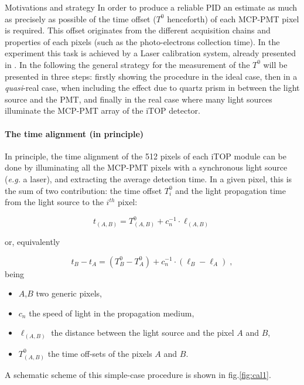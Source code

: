\documentclass[a4paper,11pt]{article}
\newcommand{\eg}{{\itshape e.g. }}
\begin{document}
\begin{subsection}{Motivations and strategy}
In order to produce a reliable PID an estimate as much as precisely as possible of the time offset ($T^0$ henceforth) of each MCP-PMT pixel is required. This offset originates from the different acquisition chains and properties of each pixels (such as the photo-electrons collection time). In the experiment this task is achieved by a Laser calibration system, already presented in \cite{Lasr_calib_syst_PD}. In the following the general strategy for the measurement of the $T^0$ will be presented in three steps: firstly showing the procedure in the ideal case, then in a {\itshape quasi}-real case, when including the effect due to quartz prism in between the light source and the PMT, and finally in the real case where many light sources illuminate the MCP-PMT array of the iTOP detector.

\paragraph{The time alignment (in principle)} In principle, the time alignment of the 512 pixels of each iTOP module can be done by illuminating all the MCP-PMT pixels with a synchronous light source (\eg a laser), and extracting the average detection time. In a given pixel, this is the sum of two contribution: the time offset $T^0_i$ and the light propagation time from the light source to the $i^{th}$ pixel:

\begin{equation}\label{eq:T0_def}
t_{(A,B)}=T^0_{(A,B)}+c_n^{-1} \cdot \ell_{(A,B)}
\end{equation}

or, equivalently

\begin{equation}\label{eq:delta_T0_def}
t_B-t_A=(T^0_B-T^0_A)+c_n^{-1}\cdot(\ell_B -\ell_A)\; ,
\end{equation}
being 
\begin{itemize}
\item $A$,$B$ two generic pixels,
\item $c_n$ the speed of light in the propagation medium,
\item $\ell_{(A,B)}$ the distance between the light source and the pixel $A$ and $B$,
\item $T^0_{(A,B)}$ the time off-sets of the pixels $A$ and $B$. 
\end{itemize}

A schematic scheme of this simple-case procedure is shown in fig.\ref{fig:cal1}.


\end{subsection}
\end{document}
